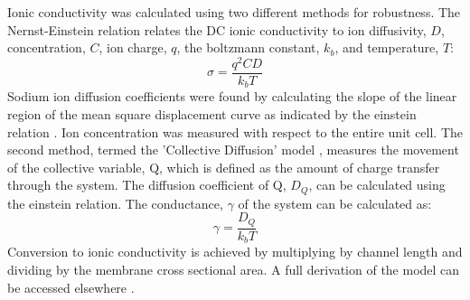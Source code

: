 Ionic conductivity was calculated using two different methods for
robustness. The Nernst-Einstein relation relates 
the DC ionic conductivity to ion diffusivity, $D$, concentration,
$C$, ion charge, $q$, the boltzmann constant, $k_b$, and temperature,
$T$: $$\sigma = \dfrac{q^2CD}{k_b T}$$ Sodium ion diffusion 
coefficients were found by calculating the slope of the linear
region of the mean square displacement curve as indicated by the
einstein relation \cite{einstein_investigations_1956}. Ion concentration
was measured with respect to the entire unit cell. The second method, 
termed the 'Collective Diffusion' model \cite{liu_collective_2013}, 
measures the movement of the collective variable, Q, which is defined as
the amount of charge transfer through the system. The diffusion 
coefficient of Q, $D_Q$, can be calculated using the einstein relation.
The conductance, $\gamma$ of the system can be calculated as:
$$ \gamma = \dfrac{D_Q}{k_b T} $$ Conversion to ionic conductivity is
achieved by multiplying by channel length and dividing by the membrane
cross sectional area. A full derivation of the model can be accessed 
elsewhere \cite{liu_collective_2013}.  
